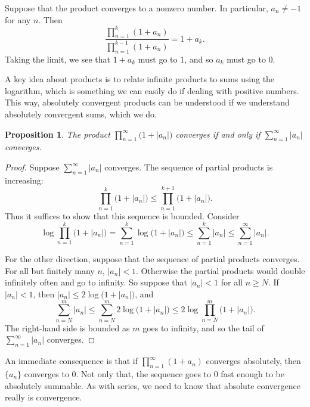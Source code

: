 \documentclass[12pt,openany]{book}
\newcommand{\sabs}[1]{\lvert {#1} \rvert}
\theoremstyle{plain}
\newtheorem{prop}[thm]{Proposition}
\theoremstyle{remark}
\theoremstyle{definition}
\theoremstyle{exercise}
\theoremstyle{example}
\begin{document}
Suppose that the product converges to a nonzero number.
In particular, $a_n \neq -1$ for any $n$.  Then
\begin{equation*}
\frac{
\prod_{n=1}^{k} (1+a_n)
}{
\prod_{n=1}^{k-1} (1+a_n)
}
=1+a_k .
\end{equation*}
Taking the limit, we see that $1+a_k$ must go to $1$,
and so $a_k$ must go to $0$.

A key idea about products is to relate infinite products to sums using the
logarithm, which is something we can easily do if dealing with positive
numbers.
This way, absolutely convergent products can be understood
if we understand absolutely convergent sums, which we do.

\begin{prop} \label{prop:infprodabsconvinfsum}
The product $\prod_{n=1}^\infty \bigl(1+\sabs{a_n}\bigr)$ converges if and only if
$\sum_{n=1}^\infty \sabs{a_n}$ converges.
\end{prop}

\begin{proof}
Suppose $\sum_{n=1}^\infty \sabs{a_n}$ converges.
The sequence of partial products is increasing:
\begin{equation*}
\prod_{n=1}^k \bigl(1+\sabs{a_n}\bigr) \leq
\prod_{n=1}^{k+1} \bigl(1+\sabs{a_n}\bigr) .
\end{equation*}
Thus it suffices to show that this sequence is bounded.
Consider
\begin{equation*}
\log \prod_{n=1}^k \bigl(1+\sabs{a_n}\bigr)
=
\sum_{n=1}^k \log \bigl(1+\sabs{a_n}\bigr)
\leq
\sum_{n=1}^k \sabs{a_n} \leq
\sum_{n=1}^\infty \sabs{a_n} .
\end{equation*}

For the other direction, suppose that the sequence of partial products
converges.  For all but finitely many $n$, $\sabs{a_n} < 1$.
Otherwise the partial products would double infinitely often and go to
infinity.  So suppose that $\sabs{a_n} < 1$ for all $n \geq N$.
If $\sabs{a_n} < 1$, then $\sabs{a_n} \leq 2 \log \bigl(1+\sabs{a_n}\bigr)$,
and
\begin{equation*}
\sum_{n=N}^m \sabs{a_n}
\leq
\sum_{n=N}^m 2 \log \bigl(1+\sabs{a_n}\bigr)
\leq
2 \log \prod_{n=N}^m \bigl(1+\sabs{a_n}\bigr) .
\end{equation*}
The right-hand side is bounded as $m$ goes to infinity, and so the tail of
$\sum_{n=1}^\infty \sabs{a_n}$ converges.
\end{proof}

An immediate consequence is that if 
$\prod_{n=1}^\infty (1+a_n)$ converges absolutely, then
$\{ a_n \}$ converges to $0$.  Not only that, the
sequence
goes to $0$ fast enough to be absolutely summable.
As with series, we need to know that absolute convergence really is convergence.
\end{document}
